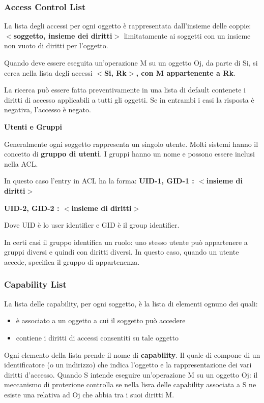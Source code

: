 \documentclass{article}
\begin{document}
\subsubsection{Access Control List}
La lista degli accessi per ogni oggetto è rappresentata dall'insieme delle coppie: \textbf{$<$soggetto, insieme dei diritti$>$}
limitatamente ai soggetti con un insieme non vuoto di diritti per l'oggetto.

Quando deve essere eseguita un'operazione M su un oggetto Oj, da parte di Si, si cerca nella lista degli accessi \textbf{$<$Si, Rk$>$, con M appartenente a Rk}.

La ricerca può essere fatta preventivamente in una lista di default contenete i diritti di accesso applicabili a tutti gli oggetti. 
Se in entrambi i casi la risposta è negativa, l'accesso è negato.

\vspace{3mm}
\textbf{Utenti e Gruppi}
\vspace{3mm}

Generalmente ogni soggetto rappresenta un singolo utente. Molti sistemi hanno il concetto di \textbf{gruppo di utenti}. I gruppi hanno un nome e possono essere inclusi nella ACL.

In questo caso l'entry in ACL ha la forma:
\textbf{UID-1, GID-1 : $<$insieme di diritti$>$}

\textbf{UID-2, GID-2 : $<$insieme di diritti$>$}

Dove UID è lo user identifier e GID è il group identifier.

\vspace{3mm}
In certi casi il gruppo identifica un ruolo: uno stesso utente può appartenere a gruppi diversi e quindi  con diritti diversi. In questo caso, quando un utente accede, specifica il
gruppo di appartenenza.

\subsubsection{Capability List}
La lista delle capability, per ogni soggetto, è la lista di elementi ognuno dei quali:
\begin{itemize}
    \item è associato a un oggetto a cui il soggetto può accedere
    \item contiene i diritti di accessi consentiti su tale oggetto
\end{itemize}

\vspace{3mm}
Ogni elemento della lista prende il nome di \textbf{capability}. Il quale di compone di un identificatore (o un indirizzo) che indica l'oggetto e la rappresentazione dei vari diritti d'accesso.
Quando S intende eseguire un'operazione M su un oggetto Oj: il meccanismo di protezione controlla se nella lisra delle capability associata a S ne esiste una relativa ad Oj che abbia
tra i suoi diritti M.
\end{document}
